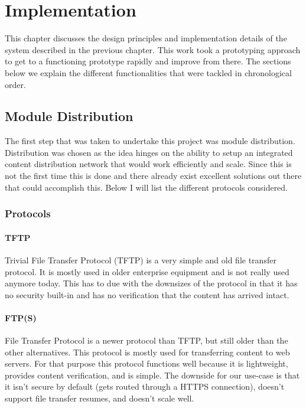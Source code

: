\chapter{\label{sec:implementation}Implementation}


This chapter discusses the design principles and implementation details of the system described in the previous chapter. This work took a prototyping approach to get to a functioning prototype rapidly and improve from there. The sections below we explain the different functionalities that were tackled in chronological order.

\section{Module Distribution}

The first step that was taken to undertake this project was module distribution. Distribution was chosen as the idea hinges on the ability to setup an integrated content distribution network that would work efficiently and scale. Since this is not the first time this is done and there already exist excellent solutions out there that could accomplish this. Below I will list the different protocols considered.

\subsection{Protocols}
\subsubsection{\textbf{TFTP}}
Trivial File Transfer Protocol (TFTP) is a very simple and old file transfer protocol. It is mostly used in older enterprise equipment and is not really used anymore today. This has to due with the downsizes of the protocol in that it has no security built-in and has no verification that the content has arrived intact.

\subsubsection{\textbf{FTP(S)}}
File Transfer Protocol is a newer protocol than TFTP, but still older than the other alternatives. This protocol is mostly used for transferring content to web servers. For that purpose this protocol functions well because it is lightweight, provides content verification, and is simple. The downside for our use-case is that it isn't secure by default (gets routed through a HTTPS connection), doesn't support file transfer resumes, and doesn't scale well.

